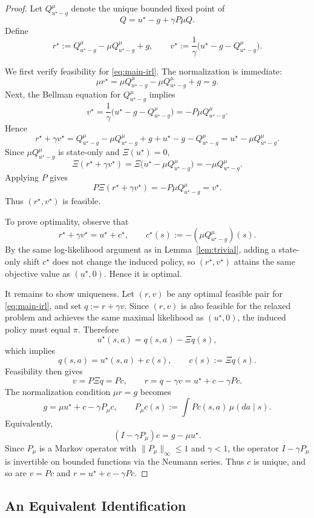 \begin{proof}
Let \(Q^\mu_{u^\star-g}\) denote the unique bounded fixed point of
\[
Q = u^\star-g+\gamma P\mu Q.
\]
Define
\[
r^\star
:=
Q^\mu_{u^\star-g}-\mu Q^\mu_{u^\star-g}+g,
\qquad
v^\star
:=
\frac{1}{\gamma}\bigl(u^\star-g-Q^\mu_{u^\star-g}\bigr).
\]

We first verify feasibility for \eqref{eq:main-irl}. The normalization is
immediate:
\[
\mu r^\star
=
\mu Q^\mu_{u^\star-g}-\mu Q^\mu_{u^\star-g}+g
=
g.
\]
Next, the Bellman equation for \(Q^\mu_{u^\star-g}\) implies
\[
v^\star
=
\frac{1}{\gamma}\bigl(u^\star-g-Q^\mu_{u^\star-g}\bigr)
=
-P\mu Q^\mu_{u^\star-g}.
\]
Hence
\[
r^\star+\gamma v^\star
=
Q^\mu_{u^\star-g}-\mu Q^\mu_{u^\star-g}+g
+
u^\star-g-Q^\mu_{u^\star-g}
=
u^\star-\mu Q^\mu_{u^\star-g}.
\]
Since \(\mu Q^\mu_{u^\star-g}\) is state-only and \(\Xi(u^\star)=0\),
\[
\Xi(r^\star+\gamma v^\star)
=
\Xi\!\bigl(u^\star-\mu Q^\mu_{u^\star-g}\bigr)
=
-\mu Q^\mu_{u^\star-g}.
\]
Applying \(P\) gives
\[
P\Xi(r^\star+\gamma v^\star)
=
-P\mu Q^\mu_{u^\star-g}
=
v^\star.
\]
Thus \((r^\star,v^\star)\) is feasible.

To prove optimality, observe that
\[
r^\star+\gamma v^\star
=
u^\star+c^\star,
\qquad
c^\star(s):= -(\mu Q^\mu_{u^\star-g})(s).
\]
By the same log-likelihood argument as in Lemma~\ref{lem:trivial}, adding a
state-only shift \(c^\star\) does not change the induced policy, so
\((r^\star,v^\star)\) attains the same objective value as \((u^\star,0)\).
Hence it is optimal.

It remains to show uniqueness. Let \((r,v)\) be any optimal feasible pair for
\eqref{eq:main-irl}, and set \(q:=r+\gamma v\). Since \((r,v)\) is also
feasible for the relaxed problem and achieves the same maximal likelihood as
\((u^\star,0)\), the induced policy must equal \(\pi\). Therefore
\[
u^\star(s,a)
=
q(s,a)-\Xi q(s),
\]
which implies
\[
q(s,a)=u^\star(s,a)+c(s),
\qquad
c(s):=\Xi q(s).
\]
Feasibility then gives
\[
v
=
P\Xi q
=
Pc,
\qquad
r
=
q-\gamma v
=
u^\star+c-\gamma Pc.
\]
The normalization condition \(\mu r=g\) becomes
\[
g
=
\mu u^\star + c - \gamma P_\mu c,
\qquad
P_\mu c(s):=\int Pc(s,a)\,\mu(da\mid s).
\]
Equivalently,
\[
(I-\gamma P_\mu)c
=
g-\mu u^\star.
\]
Since \(P_\mu\) is a Markov operator with \(\|P_\mu\|_\infty\le 1\) and
\(\gamma<1\), the operator \(I-\gamma P_\mu\) is invertible on bounded
functions via the Neumann series. Thus \(c\) is unique, and so are \(v=Pc\)
and \(r=u^\star+c-\gamma Pc\).
\end{proof}

\subsection{An Equivalent Identification}


